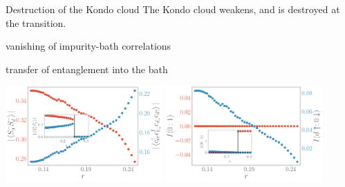 \documentclass[8pt,aspectratio=169]{beamer}
\begin{document}
\begin{frame}{Destruction of the Kondo cloud}
\centering
The Kondo cloud \alert{weakens, and is destroyed} at the transition.

\vspace*{\fill}

\begin{minipage}{0.4\textwidth}
\begin{itemize}
	\nitem vanishing of impurity-bath correlations
\end{itemize}
\end{minipage}
\hspace*{\fill}
\begin{minipage}{0.4\textwidth}
\begin{itemize}
	\nitem transfer of entanglement into the bath
\end{itemize}
\end{minipage}

\vspace*{\fill}

\includegraphics[width=0.45\textwidth]{pairing.pdf}
\hspace*{\fill}
\includegraphics[width=0.45\textwidth]{I_r.pdf}
\end{frame}
\end{document}
